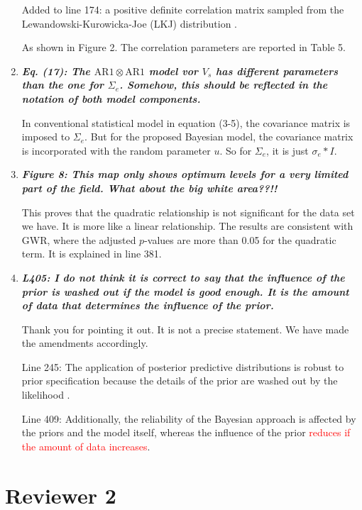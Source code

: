 \documentclass[a4paper]{article}   	%
\newcommand{\AR}{\mathrm{AR}1}
\newcommand{\qtitle}[1]{\textit{\textbf{#1}}}
\begin{document}
\begin{enumerate}
    Added to line 174: a positive definite correlation matrix sampled from the Lewandowski-Kurowicka-Joe (LKJ) distribution \parencite{Lewandowski2009Generating}. 
    
    As shown in Figure 2. The correlation parameters are reported in Table 5.
     

    \item \qtitle{Eq. (17): The $\AR\otimes \AR$ model vor $V_s$ has different parameters than the one for $\Sigma_e$. Somehow, this should be reflected in the notation of both model components.}

    In conventional statistical model in equation (3-5), the covariance matrix is imposed to $\Sigma_e$. But for the proposed Bayesian model, the covariance matrix is incorporated with the random parameter $u$. So for $\Sigma_e$, it is just $\sigma_e*I$. 

    \item \qtitle{Figure 8: This map only shows optimum levels for a very limited part of the field. What about the big white area??!!}

    This proves that the quadratic relationship is not significant for the data set we have. It is more like a linear relationship. The results are consistent with GWR, where the adjusted $p$-values are more than 0.05 for the quadratic term. It is explained in line 381. 

    \item \qtitle{L405: I do not think it is correct to say that the influence of the prior is washed out if the model is good enough. It is the amount of data that determines the influence of the prior.}
    
    Thank you for pointing it out. It is not a precise statement. We have made the amendments accordingly. 
    
    Line 245: The application of posterior predictive distributions is robust to prior specification because the details of the prior are washed out by the likelihood \parencite{Gelman2017Prior}.
    
    Line 409: Additionally, the reliability of the Bayesian approach is affected by the priors and the model itself, whereas the influence of the prior \textcolor{red}{reduces if the amount of data increases}.    
    
\end{enumerate}





\section*{Reviewer 2}
\end{document}

